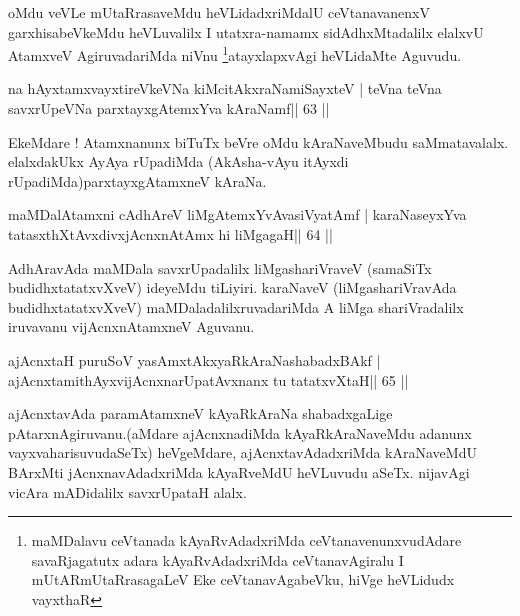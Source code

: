 \begin{artha}
oMdu veVLe mUtaRrasaveMdu heVLidadxriMdalU ceVtanavanenxV
garxhisabeVkeMdu heVLuvalilx I utatxra-namamx sidAdhxMtadalilx elalxvU
AtamxveV AgiruvadariMda niVnu \footnote{maMDalavu ceVtanada
kAyaRvAdadxriMda ceVtanavenunxvudAdare savaRjagatutx adara
kAyaRvAdadxriMda ceVtanavAgiralu I mUtARmUtaRrasagaLeV
Eke ceVtanavAgabeVku, hiVge heVLidudx vayxthaR}atayxlapxvAgi heVLidaMte
Aguvudu.
\end{artha}



\begin{shl}
na hAyxtamxvayxtireVkeVNa kiMcitAkxraNamiSayxteV |
teVna teVna savxrUpeVNa parxtayxgAtemxYva kAraNamf\hfill || 63 ||
\end{shl}

\begin{artha}
EkeMdare ! Atamxnanunx biTuTx beVre oMdu kAraNaveMbudu saMmatavalalx. elalxdakUkx AyAya rUpadiMda (AkAsha-vAyu itAyxdi rUpadiMda)\break parxtayxgAtamxneV kAraNa.
\end{artha}



\begin{shl}
maMDalAtamxni cA\s\s dhAreV liMgAtemxYvAvasiVyatAmf |
karaNaseyxYva tatasxthXtAvxdivxjAcnxnAtAmx hi liMgagaH\hfill || 64 ||
\end{shl}

\begin{artha}
AdhAravAda maMDala savxrUpadalilx liMgashariVraveV (samaSiTx
budidhxtatatxvXveV) ideyeMdu tiLiyiri. karaNaveV (liMgashariVravAda
budidhxtatatxvXveV) maMDaladalilxruvadariMda A liMga shariVradalilx
iruvavanu vijAcnxnAtamxneV Aguvanu.
\end{artha}



\begin{shl}
ajAcnxtaH puruSoV yasAmxtAkxyaRkAraNashabadxBAkf |
ajAcnxtamithAyxvijAcnxnarUpatAvxnanx tu tatatxvXtaH\hfill || 65 ||
\end{shl}

\begin{artha}
ajAcnxtavAda paramAtamxneV kAyaRkAraNa shabadxgaLige
pAtarxnAgiruvanu.\break (aMdare ajAcnxnadiMda kAyaRkAraNaveMdu adanunx
vayxvaharisuvudaSeTx) heVgeMdare, ajAcnxtavAdadxriMda kAraNaveMdU BArxMti
jAcnxnavAdadxriMda kAyaRveMdU heVLuvudu aSeTx. nijavAgi vicAra
mADidalilx savxrUpataH alalx. 
\end{artha}



